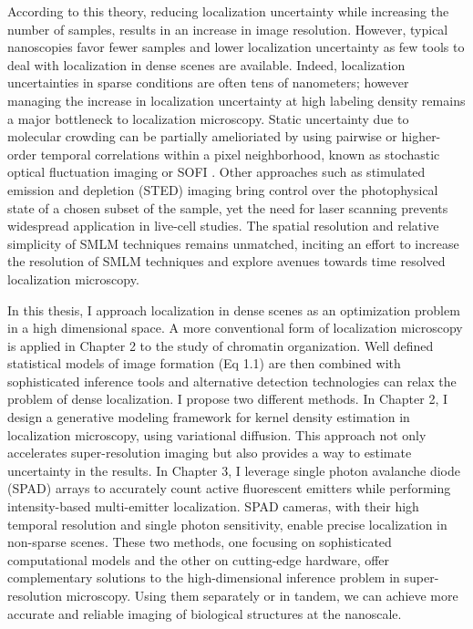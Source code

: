 According to this theory, reducing localization uncertainty while increasing the number of samples, results in an increase in image resolution. However, typical nanoscopies favor fewer samples and lower localization uncertainty as few tools to deal with localization in dense scenes are available. Indeed, localization uncertainties in sparse conditions are often tens of nanometers; however managing the increase in localization uncertainty at high labeling density remains a major bottleneck to localization microscopy. Static uncertainty due to molecular crowding can be partially amelioriated by using pairwise or higher-order temporal correlations within a pixel neighborhood, known as stochastic optical fluctuation imaging or SOFI \parencite{Dertinger2009}. Other approaches such as stimulated emission and depletion (STED) imaging bring control over the photophysical state of a chosen subset of the sample, yet the need for laser scanning prevents widespread application in live-cell studies. The spatial resolution and relative simplicity of SMLM techniques remains unmatched, inciting an effort to increase the resolution of SMLM techniques and explore avenues towards time resolved localization microscopy.

In this thesis, I approach localization in dense scenes as an optimization problem in a high dimensional space. A more conventional form of localization microscopy is applied in Chapter 2 to the study of chromatin organization. Well defined statistical models of image formation (Eq 1.1) are then combined with sophisticated inference tools and alternative detection technologies can relax the problem of dense localization. I propose two different methods. In Chapter 2, I design a generative modeling framework for kernel density estimation in localization microscopy, using variational diffusion. This approach not only accelerates super-resolution imaging but also provides a way to estimate uncertainty in the results. In Chapter 3,  I leverage single photon avalanche diode (SPAD) arrays to accurately count active fluorescent emitters while performing intensity-based multi-emitter localization. SPAD cameras, with their high temporal resolution and single photon sensitivity, enable precise localization in non-sparse scenes. These two methods, one focusing on sophisticated computational models and the other on cutting-edge hardware, offer complementary solutions to the high-dimensional inference problem in super-resolution microscopy. Using them separately or in tandem, we can achieve more accurate and reliable imaging of biological structures at the nanoscale.

